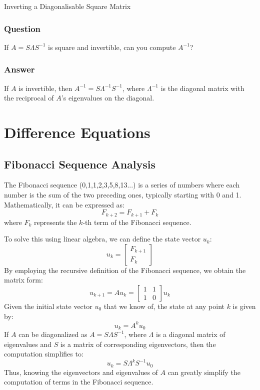 \begin{examplebox}{Inverting a Diagonalisable Square Matrix}    

\subsubsection*{Question} If \( A = S\Lambda S^{-1} \) is square and invertible, can you compute \( A^{-1} \)?

\subsubsection*{Answer} If \( A \) is invertible, then \( A^{-1} = S\Lambda^{-1}S^{-1} \), where \( \Lambda^{-1} \) is the diagonal matrix with the reciprocal of \( A \)'s eigenvalues on the diagonal.
\end{examplebox}


\section{Difference Equations}
\subsection*{Fibonacci Sequence Analysis}

The Fibonacci sequence (0,1,1,2,3,5,8,13...) is a series of numbers where each number is the sum of the two preceding ones, typically starting with 0 and 1. Mathematically, it can be expressed as:
\begin{equation}
    F_{k+2} = F_{k+1} + F_k
\end{equation}
where $F_k$ represents the $k$-th term of the Fibonacci sequence.

To solve this using linear algebra, we can define the state vector $u_k$:
\begin{equation}
    u_k = \begin{bmatrix}
    F_{k+1} \\
    F_k
    \end{bmatrix}
\end{equation}
By employing the recursive definition of the Fibonacci sequence, we obtain the matrix form:
\begin{equation}
    u_{k+1} = A u_k = \begin{bmatrix}
    1 & 1 \\
    1 & 0
    \end{bmatrix} u_k
\end{equation}
Given the initial state vector $u_0$ that we know of, the state at any point $k$ is given by:
\begin{equation}
    u_k = A^k u_0
\end{equation}
If $A$ can be diagonalized as $A = S \Lambda S^{-1}$, where $\Lambda$ is a diagonal matrix of eigenvalues and $S$ is a matrix of corresponding eigenvectors, then the computation simplifies to:
\begin{equation}
    u_k = S \Lambda^k S^{-1} u_0
\end{equation}
Thus, knowing the eigenvectors and eigenvalues of $A$ can greatly simplify the computation of terms in the Fibonacci sequence.

